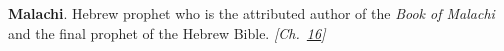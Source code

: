 \textbf{Malachi}. Hebrew prophet who is the attributed author of the \emph{Book of Malachi} and the final prophet of the Hebrew Bible. \emph{[Ch.~\hyperref[ch:falsevacuumthreat]{16}]}

